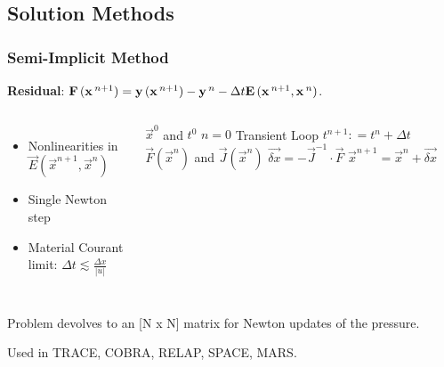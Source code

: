 \documentclass[compress,xcolor=table]{beamer}
\begin{document}
\subsection[Solution Methods]{Solution Methods}
\begin{frame}
\frametitle{Semi-Implicit Method}
\textbf{Residual}: $\vec{F}(\vec{x}^{n+1}) = \vec{y}(\vec{x}^{n+1}) - \vec{y}^{n} - \dt{} \vec{E}(\vec{x}^{n+1},\vec{x}^{n})$.

\begin{columns}

\begin{itemize}
\item{Nonlinearities in $\vec{E}(\vec{x}^{n+1},\vec{x}^{n})$}
\item{Single Newton step}
\item{Material Courant limit: $ \Delta t \lesssim \frac{\Delta x}{|u|}$}
\end{itemize}


\begin{algorithmic}
\scriptsize
\Require $\vec{x}^{0}$ and $t^{0}$
\Set $n = 0$
\Loop \; Transient Loop
    \State $t^{n+1} : = t^{n} + \Delta t$
	\Calculate $\vec{F}(\vec{x}^{n})$ and $\vec{J}(\vec{x}^{n})$
	\Calculate $\vec{\delta x} = - \vec{J}^{-1}\cdot\vec{F}$
	\Calculate $\vec{x}^{n+1} = \vec{x}^{n} + \vec{\delta x}$
\end{algorithmic}
\end{columns}

Problem devolves to an [N x N] matrix for Newton updates of the pressure. 

Used in TRACE, COBRA, RELAP, SPACE, MARS.

\end{frame}
\end{document}
